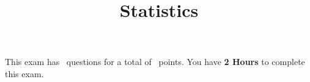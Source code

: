 

\usepackage{color}
\usepackage{tikz}
\usetikzlibrary{arrows,backgrounds,snakes}
\lstset{numbers=left}


\printanswers

\title{Statistics}
\maketitle



\begin{center}
    This exam has \numquestions\ questions for a total of \numpoints\
    points. You have {\bf 2 Hours} to complete this exam.
\end{center}




